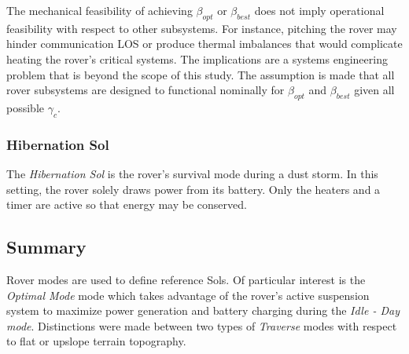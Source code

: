 The mechanical feasibility of achieving $\beta_{opt}$ or $\beta_{best}$ does not imply operational feasibility with respect to other subsystems. For instance, pitching the rover may hinder communication \ac{LOS} or produce thermal imbalances that would complicate heating the rover's critical systems. The implications are a systems engineering problem that is beyond the scope of this study. The assumption is made that all rover subsystems are designed to functional nominally for $\beta_{opt}$ and $\beta_{best}$ given all possible $\gamma_{c}$.

\subsubsection{Hibernation Sol}
\label{sec:ReferenceSols:HibernationSol}
The \textit{Hibernation Sol} is the rover's survival mode during a dust storm. In this setting, the rover solely draws power from its battery. Only the heaters and a timer are active so that energy may be conserved.



\subsection{Summary}
\label{sec:ReferenceSols:SummaryAndConclusion}
Rover modes are used to define reference Sols. Of particular interest is the \textit{Optimal Mode} mode which takes advantage of the rover's active suspension system to maximize power generation and battery charging during the \textit{Idle - Day mode}. Distinctions were made between two types of \textit{Traverse} modes with respect to flat or upslope terrain topography.

